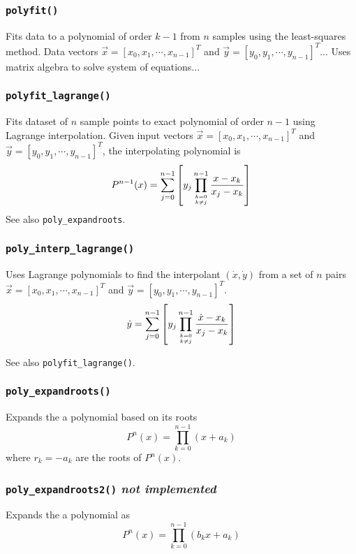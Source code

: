 \subsubsection{{\tt polyfit()}}
Fits data to a polynomial of order $k-1$ from $n$ samples using the
least-squares method.
Data vectors
$\vec{x}=[x_0,x_1,\cdots,x_{n-1}]^T$ and 
$\vec{y}=[y_0,y_1,\cdots,y_{n-1}]^T$...
Uses matrix algebra to solve system of equations...

\subsubsection{{\tt polyfit\_lagrange()}}
Fits dataset of $n$ sample points to exact polynomial of order $n-1$ using
Lagrange interpolation.
Given input vectors
$\vec{x}=[x_0,x_1,\cdots,x_{n-1}]^T$ and 
$\vec{y}=[y_0,y_1,\cdots,y_{n-1}]^T$, the interpolating polynomial is
\[
    P^{n-1}(x) =
        \sum_{j=0}^{n-1}
        {
            \left[
            y_j
            \prod_{{k=0}\atop{k \ne j}}^{n-1}
            {
                \frac{x-x_k}{x_j-x_k}
            }
            \right]
        }
\]
See also {\tt poly\_expandroots}.

\subsubsection{{\tt poly\_interp\_lagrange()}}
Uses Lagrange polynomials to find the interpolant
$(\dot{x},\dot{y})$ from a set of $n$ pairs
$\vec{x}=[x_0,x_1,\cdots,x_{n-1}]^T$ and 
$\vec{y}=[y_0,y_1,\cdots,y_{n-1}]^T$.
\[
    \dot{y} =
        \sum_{j=0}^{n-1}
        {
            \left[
            y_j
            \prod_{{k=0}\atop{k \ne j}}^{n-1}
            {
                \frac{\dot{x}-x_k}{x_j-x_k}
            }
            \right]
        }
\]

See also {\tt polyfit\_lagrange()}.

\subsubsection{{\tt poly\_expandroots()}}
Expands the a polynomial based on its roots
\[
    P^n(x) = \prod_{k=0}^{n-1}{(x+a_k)}
\]
where $r_k=-a_k$ are the roots of $P^n(x)$.

\subsubsection{{\tt poly\_expandroots2()} {\it not implemented}}
Expands the a polynomial as
\[
    P^n(x) = \prod_{k=0}^{n-1}{(b_kx+a_k)}
\]

